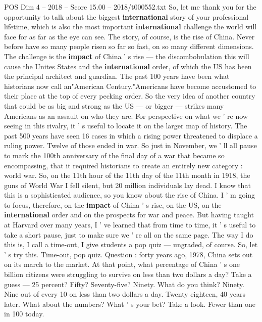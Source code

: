 \begin{textsample}{POS Dim 4 – 2018 – Score 15.00 – 2018/t000552.txt}  \label{ex:f4_pos_066}
So, let me thank you for the opportunity to talk about the biggest \textbf{international} story of your professional lifetime, which is also the most important \textbf{international} challenge the world will face for as far as the eye can see.
The story, of course, is the rise of China.
Never before have so many people risen so far so fast, on so many different dimensions.
The challenge is the \textbf{impact} of China ' s rise — the discombobulation this will cause the Unites States and the \textbf{international} order, of which the US has been the principal architect and guardian.
The past 100 years have been what historians now call an"American Century."Americans have become accustomed to their place at the top of every pecking order.
So the very idea of another country that could be as big and strong as the US — or bigger — strikes many Americans as an assault on who they are.
For perspective on what we ' re now seeing in this rivalry, it ' s useful to locate it on the larger map of history.
The past 500 years have seen 16 cases in which a rising power threatened to displace a ruling power.
Twelve of those ended in war.
So just in November, we ' ll all pause to mark the 100th anniversary of the final day of a war that became so encompassing, that it required historians to create an entirely new category : world war.
So, on the 11th hour of the 11th day of the 11th month in 1918, the guns of World War I fell silent, but 20 million individuals lay dead.
I know that this is a sophisticated audience, so you know about the rise of China.
I ' m going to focus, therefore, on the \textbf{impact} of China ' s rise, on the US, on the \textbf{international} order and on the prospects for war and peace.
But having taught at Harvard over many years, I ' ve learned that from time to time, it ' s useful to take a short pause, just to make sure we ' re all on the same page.
The way I do this is, I call a time-out, I give students a pop quiz — ungraded, of course.
So, let ' s try this.
Time-out, pop quiz.
Question : forty years ago, 1978, China sets out on its march to the market.
At that point, what percentage of China ' s one billion citizens were struggling to survive on less than two dollars a day?
Take a guess — 25 percent?
Fifty?
Seventy-five?
Ninety.
What do you think?
Ninety.
Nine out of every 10 on less than two dollars a day.
Twenty eighteen, 40 years later.
What about the numbers?
What ' s your bet?
Take a look.
Fewer than one in 100 today.

\end{textsample}
